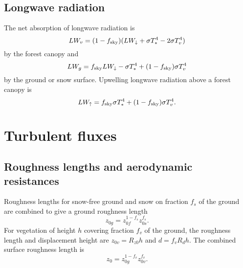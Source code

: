 \documentclass{article}
\begin{document}
\subsection{Longwave radiation}
The net absorption of longwave radiation is
\begin{equation}
LW_v = (1 - f_{\rm sky}) (LW_\downarrow  + \sigma T_*^4 - 2\sigma T_v^4) 
\end{equation} 
by the forest canopy and
\begin{equation}
LW_g = f_{\rm sky}LW_\downarrow - \sigma T_*^4  + (1 - f_{\rm sky})\sigma T_v^4
\label{eq:LWg}
\end{equation}
by the ground or snow surface. Upwelling longwave radiation above a forest canopy is
\begin{equation}
LW_\uparrow = f_{\rm sky}\sigma T_*^4  + (1 - f_{\rm sky})\sigma T_v^4.
\end{equation}


\section{Turbulent fluxes}

\subsection{Roughness lengths and aerodynamic resistances}

Roughness lengths for snow-free ground and snow on fraction $f_s$ of the ground are combined to give a ground roughness length
\begin{equation}
z_{0g} =  z_{0f}^{1-f_s} z_{0s}^{f_s}.
\end{equation}
For vegetation of height $h$ covering fraction $f_v$ of the ground, the roughness length and displacement height are $z_{0v} = R_{z0}h$ and $d = f_vR_dh$. The combined surface roughness length is
\begin{equation}
z_0 = z_{0g}^{1-f_v} z_{0v}^{f_v}.
\end{equation}
\end{document}
